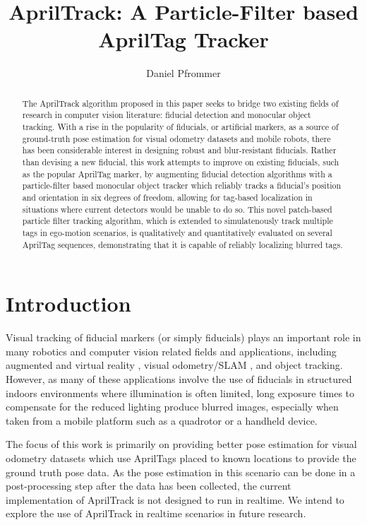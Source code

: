 \documentclass[letterpaper, 10 pt, conference]{ieeeconf}
\title{\textbf{AprilTrack: A Particle-Filter based AprilTag Tracker}}
\author{Daniel Pfrommer}
\date{}
\begin{document}
\maketitle

\begin{abstract}

	The AprilTrack algorithm proposed in this paper seeks to bridge two existing fields of research in computer vision literature: fiducial detection and monocular object tracking. With a rise in the popularity of fiducials, or artificial markers, as a source of ground-truth pose estimation for visual odometry datasets and mobile robots, there has been considerable interest in designing robust and blur-resistant fiducials. Rather than devising a new fiducial, this work attempts to improve on existing fiducials, such as the popular AprilTag marker, by augmenting fiducial detection algorithms with a particle-filter based monocular object tracker which reliably tracks a fiducial's position and orientation in six degrees of freedom, allowing for tag-based localization in situations where current detectors would be unable to do so. This novel patch-based particle filter tracking algorithm, which is extended to simulatenously track multiple tags in ego-motion scenarios, is qualitatively and quantitatively evaluated on several AprilTag sequences, demonstrating that it is capable of reliably localizing blurred tags.
	
\end{abstract}

\section{Introduction}


Visual tracking of fiducial markers (or simply fiducials) plays an important role in many robotics and computer vision related fields and applications, including augmented and virtual reality \citep{AugmentedReality}, visual odometry/SLAM \citep{TagSLAM}, and object tracking. However, as many of these applications involve the use of fiducials in structured indoors environments where illumination is often limited, long exposure times to compensate for the reduced lighting produce blurred images, especially when taken from a mobile platform such as a quadrotor or a handheld device.

The focus of this work is primarily on providing better pose estimation for visual odometry datasets which use AprilTags placed to known locations to provide the ground truth pose data. As the pose estimation in this scenario can be done in a post-processing step after the data has been collected, the current implementation of AprilTrack is not designed to run in realtime. We intend to explore the use of AprilTrack in realtime scenarios in future research.
\end{document}
